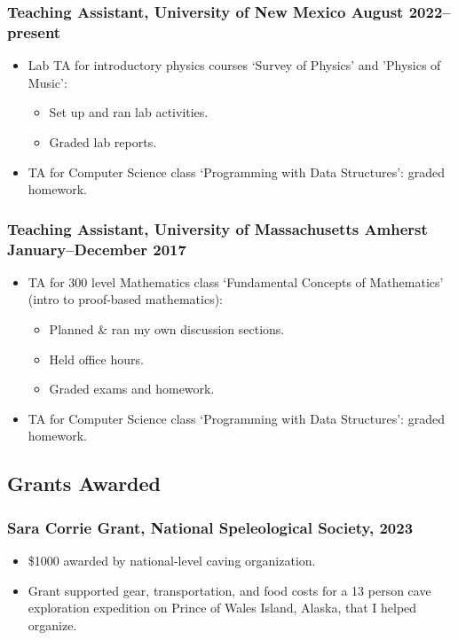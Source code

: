 \documentclass{article}
\begin{document}
		\subsubsection*{Teaching Assistant, University of New Mexico \hfill \normalfont \normalsize August 2022--present}
		\begin{itemize}
			\item Lab TA for introductory physics courses `Survey of Physics' and 'Physics of Music':
			\begin{itemize}
				\item Set up and ran lab activities.
				\item Graded lab reports.
			\end{itemize}
			\item TA for Computer Science class `Programming with Data Structures': graded homework.
		\end{itemize}
		\subsubsection*{Teaching Assistant, University of Massachusetts Amherst \hfill \normalfont \normalsize January--December 2017}
			\begin{itemize}
			\item TA for 300 level Mathematics class `Fundamental Concepts of Mathematics' (intro to proof-based mathematics):
			\begin{itemize}
				\item Planned \& ran my own discussion sections.
				\item Held office hours.
				\item Graded exams and homework.
			\end{itemize}
			\item TA for Computer Science class `Programming with Data Structures': graded homework.
			\end{itemize}
	\subsection*{Grants Awarded}
		\subsubsection*{Sara Corrie Grant, National Speleological Society, 2023}
			\begin{itemize}
				\item \$1000 awarded by national-level caving organization.
				\item Grant supported gear, transportation, and food costs for a 13 person cave exploration expedition on Prince of Wales Island, Alaska, that I helped organize.
			\end{itemize}
\end{document}
